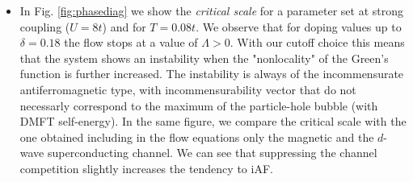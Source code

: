 \documentclass[paper=a4, fontsize=11pt]{scrartcl} %
\numberwithin{equation}{section} %
\numberwithin{figure}{section} %
\numberwithin{table}{section} %
\begin{document}
\begin{itemize}
\item In Fig. \ref{fig:phasediag} we show the \textit{critical scale} for a parameter set at strong coupling ($U=8t$) and for $T=0.08t$. 
We observe that for doping values up to $\delta = 0.18$ the flow stops at a value of $\Lambda > 0$. With our cutoff choice this means that the system shows an instability when the "nonlocality" of the Green's function is further increased. 
The instability is always of the incommensurate antiferromagnetic type, with incommensurability vector that do not necessarly correspond to the maximum of the particle-hole bubble (with DMFT self-energy). 
In the same figure, we compare the critical scale with the one obtained including in the flow equations only the magnetic and the $d$-wave superconducting channel. 
We can see that suppressing the channel competition slightly increases the tendency to iAF.


\end{itemize}
\end{document}
